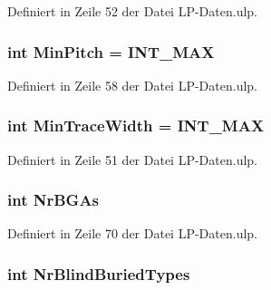 Definiert in Zeile 52 der Datei L\+P-\/\+Daten.\+ulp.

\hypertarget{_l_p-_daten_8ulp_a1af335d5e5479a7d171c804c964acb09}{}
\subsubsection[{Min\+Pitch}]{\setlength{\rightskip}{0pt plus 5cm}int Min\+Pitch = I\+N\+T\+\_\+\+M\+A\+X}\label{_l_p-_daten_8ulp_a1af335d5e5479a7d171c804c964acb09}


Definiert in Zeile 58 der Datei L\+P-\/\+Daten.\+ulp.

\hypertarget{_l_p-_daten_8ulp_acbf2bff16d118b227bd700f39efbc19a}{}
\subsubsection[{Min\+Trace\+Width}]{\setlength{\rightskip}{0pt plus 5cm}int Min\+Trace\+Width = I\+N\+T\+\_\+\+M\+A\+X}\label{_l_p-_daten_8ulp_acbf2bff16d118b227bd700f39efbc19a}


Definiert in Zeile 51 der Datei L\+P-\/\+Daten.\+ulp.

\hypertarget{_l_p-_daten_8ulp_a24f35fb03d408576d550fd7f0863f451}{}
\subsubsection[{Nr\+B\+G\+As}]{\setlength{\rightskip}{0pt plus 5cm}int Nr\+B\+G\+As}\label{_l_p-_daten_8ulp_a24f35fb03d408576d550fd7f0863f451}


Definiert in Zeile 70 der Datei L\+P-\/\+Daten.\+ulp.

\hypertarget{_l_p-_daten_8ulp_a9ddb3d90ec1e540b0c848b2b44331e19}{}
\subsubsection[{Nr\+Blind\+Buried\+Types}]{\setlength{\rightskip}{0pt plus 5cm}int Nr\+Blind\+Buried\+Types}\label{_l_p-_daten_8ulp_a9ddb3d90ec1e540b0c848b2b44331e19}



